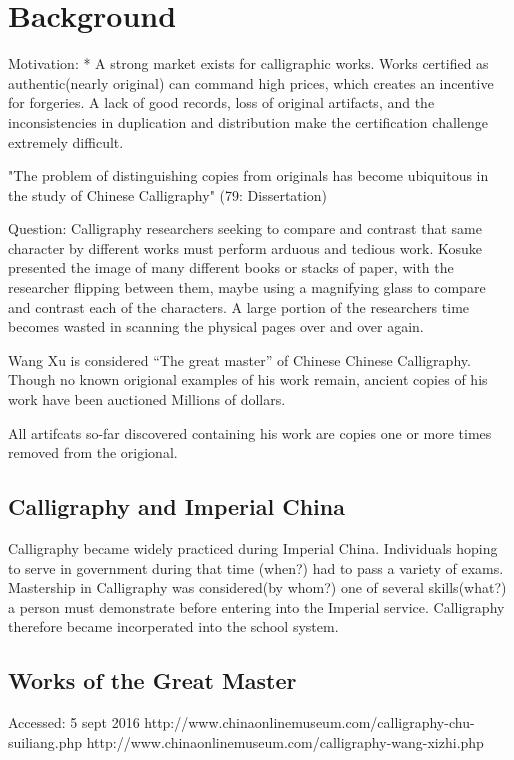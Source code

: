 \chapter{Background}
Motivation:
    *  A strong market exists for calligraphic works.  Works certified as authentic(nearly original) can command high prices, which creates an incentive for forgeries.  A lack of good records, loss of original artifacts, and the inconsistencies in duplication and distribution make the certification challenge extremely difficult.


"The problem of distinguishing copies from originals has become ubiquitous in the study of Chinese Calligraphy" (79: Dissertation)

    Question:  Calligraphy researchers seeking to compare and contrast that same character by different works must perform arduous and tedious work.
                Kosuke presented the image of many different books or stacks of paper, with the researcher flipping between them,  maybe using a magnifying glass to compare and contrast each of the characters.  A large portion of the researchers time becomes wasted in scanning the physical pages over and over again.


Wang Xu is considered ``The great master'' of Chinese Chinese Calligraphy.  Though no known origional examples of his work remain, ancient copies of his work have been auctioned Millions of dollars.

All artifcats so-far discovered containing his work are copies one or more times removed from the origional.

\section{Calligraphy and Imperial China}

Calligraphy became widely practiced during Imperial China.  Individuals hoping to serve in government during that time (when?) had to pass a variety of exams.  Mastership in Calligraphy was considered(by whom?) one of several skills(what?) a person must demonstrate before entering into the Imperial service.  Calligraphy therefore became incorperated into the school system. 

\section{Works of the Great Master}
Accessed:  5 sept 2016
http://www.chinaonlinemuseum.com/calligraphy-chu-suiliang.php 
http://www.chinaonlinemuseum.com/calligraphy-wang-xizhi.php

